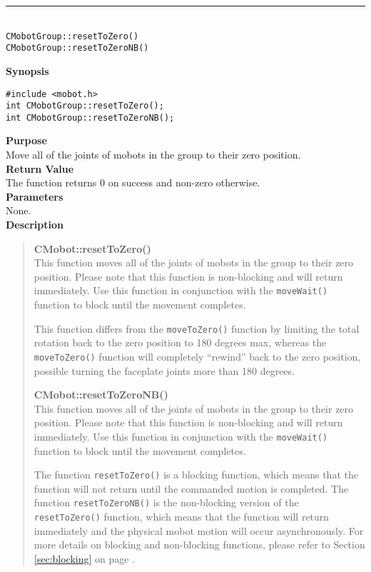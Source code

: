 \noindent
\vspace{5pt}
\rule{4.5in}{0.015in}\\
\noindent
{\LARGE \texttt{CMobotGroup::resetToZero()}}\\
{\LARGE \texttt{CMobotGroup::resetToZeroNB()}}\\
{}

\noindent
{\bf Synopsis}
\vspace{-8pt}
\begin{verbatim}
#include <mobot.h>
int CMobotGroup::resetToZero();
int CMobotGroup::resetToZeroNB();
\end{verbatim}

\noindent
{\bf Purpose}\\
Move all of the joints of mobots in the group to their zero position.\\

\noindent
{\bf Return Value}\\
The function returns 0 on success and non-zero otherwise.\\

\noindent
{\bf Parameters}\\
None.\\

\noindent
{\bf Description}\\
\vspace{-12pt}
\begin{quote}
{\bf CMobot::resetToZero()}\\
This function moves all of the joints of mobots in the group to their zero position.
Please note that this function is non-blocking and will return immediately. Use
this function in conjunction with the \texttt{moveWait()} function to block
until the movement completes.

This function differs from the \texttt{moveToZero()} function by limiting the total
rotation back to the zero position to 180 degrees max, whereas the \texttt{moveToZero()}
function will completely ``rewind'' back to the zero position, possible turning
the faceplate joints more than 180 degrees.

{\bf CMobot::resetToZeroNB()}\\
This function moves all of the joints of mobots in the group to their zero position.
Please note that this function is non-blocking and will return immediately. Use
this function in conjunction with the \texttt{moveWait()} function to block
until the movement completes.

The function \texttt{resetToZero()} is a blocking function, which means that 
the function will not return until the commanded motion is 
completed. The function \texttt{resetToZeroNB()} is the non-blocking version of
the \texttt{resetToZero()} function, which means that the function will return
immediately and the physical mobot motion will occur asynchronously. For
more details on blocking and non-blocking functions, please refer to 
Section \ref{sec:blocking} on page \pageref{sec:blocking}.\\
\end{quote}

